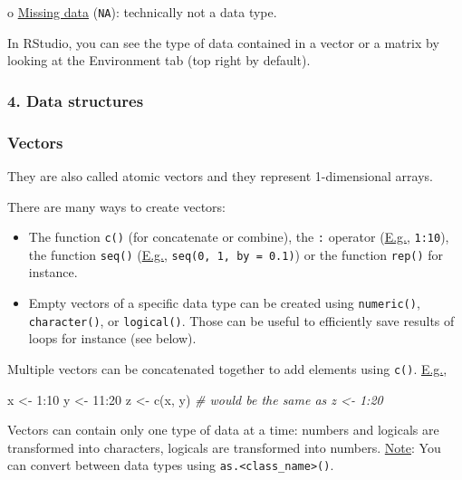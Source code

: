 \documentclass[
]{article}
\newenvironment{Shaded}{\begin{snugshade}}{\end{snugshade}}
\newcommand{\CommentTok}[1]{\textcolor[rgb]{0.56,0.35,0.01}{\textit{#1}}}
\newcommand{\DecValTok}[1]{\textcolor[rgb]{0.00,0.00,0.81}{#1}}
\newcommand{\FunctionTok}[1]{\textcolor[rgb]{0.00,0.00,0.00}{#1}}
\newcommand{\NormalTok}[1]{#1}
\newcommand{\OtherTok}[1]{\textcolor[rgb]{0.56,0.35,0.01}{#1}}
\newcommand{\SpecialCharTok}[1]{\textcolor[rgb]{0.00,0.00,0.00}{#1}}
\begin{document}
o \underline{Missing data} (\texttt{NA}): technically not a data type.

In RStudio, you can see the type of data contained in a vector or a
matrix by looking at the Environment tab (top right by default).

\hypertarget{data-structures}{%
\subsubsection{4. Data structures}\label{data-structures}}

\hypertarget{vectors}{%
\subsubsection{Vectors}\label{vectors}}

They are also called atomic vectors and they represent 1-dimensional
arrays.

There are many ways to create vectors:

\begin{itemize}
\item
  The function \texttt{c()} (for concatenate or combine), the \texttt{:}
  operator (\underline{E.g.}, \texttt{1:10}), the function
  \texttt{seq()} (\underline{E.g.}, \texttt{seq(0,\ 1,\ by\ =\ 0.1)}) or
  the function \texttt{rep()} for instance.
\item
  Empty vectors of a specific data type can be created using
  \texttt{numeric()}, \texttt{character()}, or \texttt{logical()}. Those
  can be useful to efficiently save results of loops for instance (see
  below).
\end{itemize}

Multiple vectors can be concatenated together to add elements using
\texttt{c()}. \underline{E.g.},

\begin{Shaded}
\begin{Highlighting}[]
\NormalTok{x }\OtherTok{\textless{}{-}} \DecValTok{1}\SpecialCharTok{:}\DecValTok{10}
\NormalTok{y }\OtherTok{\textless{}{-}} \DecValTok{11}\SpecialCharTok{:}\DecValTok{20}
\NormalTok{z }\OtherTok{\textless{}{-}} \FunctionTok{c}\NormalTok{(x, y) }\CommentTok{\# would be the same as z \textless{}{-} 1:20}
\end{Highlighting}
\end{Shaded}

Vectors can contain only one type of data at a time: numbers and
logicals are transformed into characters, logicals are transformed into
numbers. \underline{Note}: You can convert between data types using
\texttt{as.\textless{}class\_name\textgreater{}()}.
\end{document}
